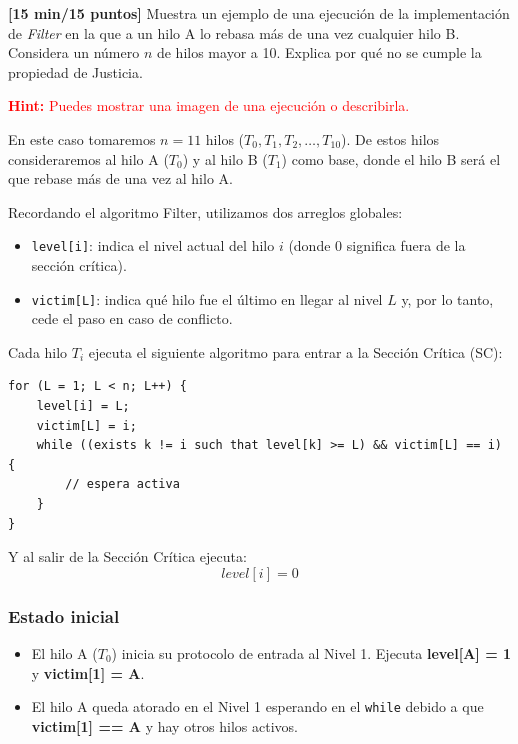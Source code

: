 \item[\textbf{1.}] \textbf{[15 min/15 puntos]} \textcolor{dkgreen}{Muestra un ejemplo de una ejecución de la implementación de \textit{Filter} en la que a un hilo A lo rebasa más de una vez cualquier hilo B. Considera un número $n$ de hilos mayor a 10. Explica por qué no se cumple la propiedad de Justicia.}

    \textcolor{red}{\textbf{Hint:} Puedes mostrar una imagen de una ejecución o describirla.}

En este caso tomaremos $n = 11$ hilos ($T_0, T_1, T_2, \dots, T_{10}$). De estos hilos consideraremos al hilo A ($T_0$) y al hilo B ($T_1$) como base, donde el hilo B será el que rebase más de una vez al hilo A.

Recordando el algoritmo Filter, utilizamos dos arreglos globales:
\begin{itemize}
    \item \texttt{level[i]}: indica el nivel actual del hilo $i$ (donde $0$ significa fuera de la sección crítica).
    \item \texttt{victim[L]}: indica qué hilo fue el último en llegar al nivel $L$ y, por lo tanto, cede el paso en caso de conflicto.
\end{itemize}

Cada hilo $T_i$ ejecuta el siguiente algoritmo para entrar a la Sección Crítica (SC):

\begin{verbatim}
for (L = 1; L < n; L++) {
    level[i] = L;
    victim[L] = i;
    while ((exists k != i such that level[k] >= L) && victim[L] == i) {
        // espera activa
    }
}
\end{verbatim}

Y al salir de la Sección Crítica ejecuta:
$$level[i] = 0$$

\subsubsection*{Estado inicial}
\begin{itemize}
    \item El hilo A ($T_0$) inicia su protocolo de entrada al Nivel 1. Ejecuta \textbf{level[A] = 1} y \textbf{victim[1] = A}.
    \item El hilo A queda atorado en el Nivel 1 esperando en el \texttt{while} debido a que \textbf{victim[1] == A} y hay otros hilos activos.
\end{itemize}

